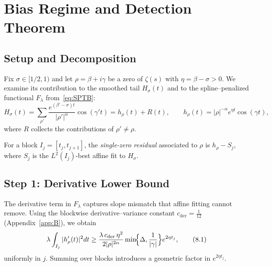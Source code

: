 
\section{Bias Regime and Detection Theorem}\label{sec:bias}

\subsection{Setup and Decomposition}

Fix $\sigma\in[1/2,1)$ and let $\rho=\beta+i\gamma$ be a zero of $\zeta(s)$ with
$\eta=\beta-\sigma>0$.  We examine its contribution to the smoothed tail
$H_\sigma(t)$ and to the spline–penalized functional $F_\lambda$
from~\eqref{eq:SPTB}:
\begin{equation*}
H_\sigma(t)
  = \sum_{\rho'} \frac{e^{(\beta'-\sigma)t}}{|\rho'|^{\alpha}}\cos(\gamma' t)
  = h_\rho(t)+R(t),
\qquad
h_\rho(t)=|\rho|^{-\alpha}e^{\eta t}\cos(\gamma t),
\end{equation*}
where $R$ collects the contributions of $\rho'\ne\rho$.

\begin{definition}\label{def:single-zero}
For a block $I_j=[t_j,t_{j+1}]$, the \emph{single-zero residual}
associated to $\rho$ is $h_\rho-S_j$, where $S_j$ is the $L^2(I_j)$-best affine fit to $H_\sigma$.
\end{definition}

\subsection{Step 1: Derivative Lower Bound}\label{step:derivative-lb}

The derivative term in $F_\lambda$ captures slope mismatch that affine fitting cannot remove.
Using the blockwise derivative–variance constant $c_{\mathrm{der}}=\tfrac1{12}$
(Appendix~\ref{app:B}), we obtain
\begin{equation}
\lambda \int_{I_j} |h_\rho'(t)|^2 dt
  \ge \frac{\lambda\,c_{\mathrm{der}}\,\eta^2}{2|\rho|^{2\alpha}}
      \min\!\Bigl\{\Delta,\frac{1}{|\gamma|}\Bigr\}
      e^{2\eta t_j},
\tag{8.1}\label{eq:derivative-lb}
\end{equation}
uniformly in $j$.  Summing over blocks introduces a geometric factor in $e^{2\eta t_j}$.

